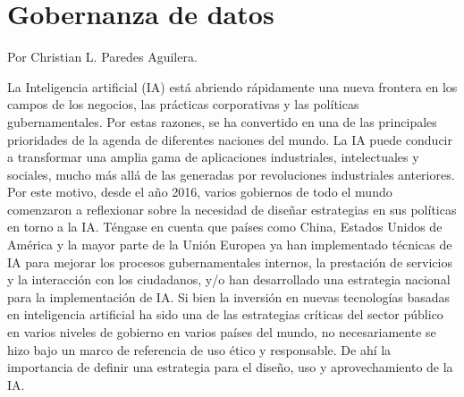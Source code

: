 \documentclass[10pt]{book}
\begin{document}
 

\chapter*{Gobernanza de datos}

\begin{center}
Por Christian L. Paredes Aguilera.
\end{center}

\vspace{1.5cm}

\begin{multicols}{2}
La Inteligencia artificial (IA) está abriendo rápidamente una nueva frontera en los campos de los negocios, las prácticas corporativas y las políticas gubernamentales. Por estas razones, se ha convertido en una de  las  principales  prioridades  de  la  agenda  de  diferentes  naciones  del  mundo.  La  IA  puede  conducir  a  transformar  una amplia gama de aplicaciones industriales, intelectuales y sociales, mucho más allá de las generadas por revoluciones industriales anteriores. Por este motivo, desde el año 2016, varios gobiernos de todo el mundo comenzaron a reflexionar sobre la necesidad  de  diseñar  estrategias  en  sus  políticas  en  torno  a  la  IA.  Téngase  en  cuenta  que  países  como  China, Estados Unidos de América y la mayor parte de la Unión Europea ya han implementado técnicas de IA para mejorar los procesos gubernamentales internos, la prestación de servicios y la interacción con los  ciudadanos,  y/o  han  desarrollado  una  estrategia  nacional  para  la  implementación  de  IA.  Si  bien  la  inversión    en    nuevas    tecnologías    basadas    en    inteligencia    artificial    ha    sido    una    de    las    estrategias  críticas  del  sector  público  en  varios  niveles  de  gobierno  en  varios  países  del  mundo,  no  necesariamente se hizo bajo un marco de referencia de uso ético y responsable. De ahí la importancia de definir una estrategia para el diseño, uso y aprovechamiento de la IA.


\end{multicols}
\end{document}
